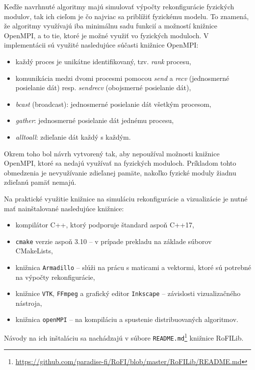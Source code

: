 \documentclass[
  digital, %
  oneside, %
  notable,   %
  lof,     %
  nolot,     %
]{fithesis3}
\begin{document}
Keďže navrhnuté algoritmy majú simulovať výpočty rekonfigurácie fyzických modulov, tak ich cieľom je čo najviac sa priblížiť fyzickému modelu. To znamená, že algoritmy využívajú iba minimálnu sadu funkcií a možností knižnice OpenMPI, a to tie, ktoré je možné využiť vo fyzických moduloch. V implementácii sú využité nasledujúce súčasti knižnice OpenMPI: 
\begin{itemize}
    \item každý proces je unikátne identifikovaný, tzv. \textit{rank} procesu, 
    \item komunikácia medzi dvomi procesmi pomocou \textit{send} a \textit{recv} (jednosmerné posielanie dát) resp. \textit{sendrecv} (obojsmerné posielanie dát), 
    \item \textit{bcast} (broadcast): jednosmerné posielanie dát všetkým procesom, 
    \item \textit{gather}: jednosmerné posielanie dát jednému procesu, 
    \item \textit{alltoall}: zdieľanie dát každý s každým. 
\end{itemize}

Okrem toho bol návrh vytvorený tak, aby nepoužíval možnosti knižnice OpenMPI, ktoré sa nedajú využívať na fyzických moduloch. Príkladom tohto obmedzenia je nevyužívanie zdieľanej pamäte, nakoľko fyzické moduly žiadnu zdieľanú pamäť nemajú. 

Na praktické využitie knižnice na simuláciu rekonfigurácie a vizualizácie je nutné mať nainštalované nasledujúce knižnice: 
\begin{itemize}
    \item kompilátor C++, ktorý podporuje štandard aspoň C++17, 
    \item \texttt{cmake} verzie aspoň 3.10 -- v prípade prekladu na základe súborov CMakeLists, 
    \item knižnica \texttt{Armadillo} -- slúži na prácu s maticami a vektormi, ktoré sú potrebné na výpočty rekonfigurácie,  
    \item knižnice \texttt{VTK}, \texttt{FFmpeg} a grafický editor \texttt{Inkscape} -- závislosti vizualizačného nástroja, 
    \item knižnica \texttt{openMPI} -- na kompiláciu a spustenie distribuovaných algoritmov. 
\end{itemize}

 Návody na ich inštaláciu sa nachádzajú v súbore \texttt{README.md}\footnote{\url{https://github.com/paradise-fi/RoFI/blob/master/RoFILib/README.md}} knižnice RoFILib. 
\end{document}
